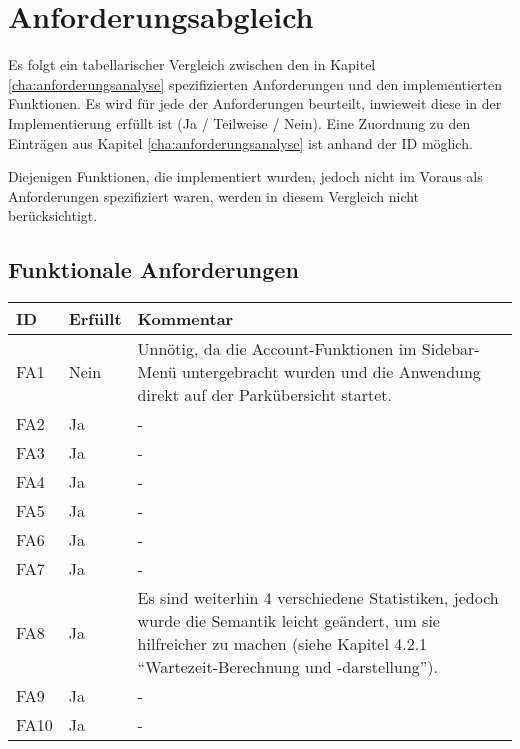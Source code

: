 \newcommand{\td}[3]{
	#1 & #2 & #3 \\ \hline
}

\chapter{Anforderungsabgleich}
\label{cha:anforderungsabgleich}

Es folgt ein tabellarischer Vergleich zwischen den in Kapitel \ref{cha:anforderungsanalyse} 
spezifizierten Anforderungen und den implementierten Funktionen. Es wird für jede der Anforderungen 
beurteilt, inwieweit diese in der Implementierung erfüllt ist (Ja / Teilweise / Nein). Eine 
Zuordnung zu den Einträgen aus Kapitel \ref{cha:anforderungsanalyse} ist anhand der ID möglich.

Diejenigen Funktionen, die implementiert wurden, jedoch nicht im Voraus als Anforderungen 
spezifiziert waren, werden in diesem Vergleich nicht berücksichtigt.

\clearpage

\section{Funktionale Anforderungen}
\label{sec:anforderungsabgleich:funktional}

\setlength{\tabcolsep}{10pt}
\renewcommand{\arraystretch}{1.3}

\begin{center}
	\begin{table}[h]
		\begin{tabular}{ | l | l | p{11.5cm} |}
			\hline
			\textbf{ID} & \textbf{Erfüllt} & \textbf{Kommentar} \\ \hline
			\td{FA1}{Nein}{Unnötig, da die Account-Funktionen im Sidebar-Menü untergebracht wurden 
			und die Anwendung direkt auf der Parkübersicht startet.}
			\td{FA2}{Ja}{-}
			\td{FA3}{Ja}{-}
			\td{FA4}{Ja}{-}
			\td{FA5}{Ja}{-}
			\td{FA6}{Ja}{-}
			\td{FA7}{Ja}{-}
			\td{FA8}{Ja}{Es sind weiterhin 4 verschiedene Statistiken, jedoch wurde die Semantik 
			leicht geändert, um sie hilfreicher zu machen (siehe Kapitel 4.2.1 
			``Wartezeit-Berechnung und -darstellung'').}
			\td{FA9}{Ja}{-}
			\td{FA10}{Ja}{-}
		\end{tabular}
	\end{table}
\end{center}


